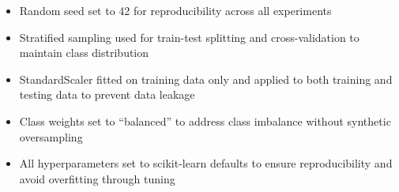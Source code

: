 \begin{itemize}[leftmargin=*]
    \item Random seed set to 42 for reproducibility across all experiments
    \item Stratified sampling used for train-test splitting and 
          cross-validation to maintain class distribution
    \item StandardScaler fitted on training data only and applied to both 
          training and testing data to prevent data leakage
    \item Class weights set to ``balanced'' to address class imbalance 
          without synthetic oversampling
    \item All hyperparameters set to scikit-learn defaults to ensure 
          reproducibility and avoid overfitting through tuning
\end{itemize}

